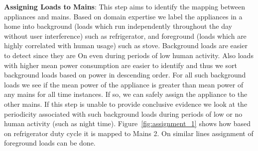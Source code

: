 \documentclass[conference]{IEEEtran}
\newcommand{\figref}[1]{Figure~\ref{#1}}
\begin{document}
\textbf{Assigning Loads to Mains}:
This step aims to identify the mapping between appliances and mains. Based on domain expertise we label the appliances in a home into background (loads which run independently throughout the day without user interference) such as refrigerator, and foreground (loads which are highly correlated with human usage) such as stove. Background loads are easier to detect since they are On even during periods of low human activity. Also loads with higher mean power consumption are easier to identify and thus we sort background loads based on power in descending order. For all such background loads we see if the mean power of the appliance is greater than mean power of any mains for all time instances. If so, we can safely assign the appliance to the other mains. If this step is unable to provide conclusive evidence we look at the periodicity associated with such background loads during periods of low or no human activity (such as night time). \figref{fig:assignment_1} shows how based on refrigerator duty cycle it is mapped to Mains 2. On similar lines assignment of foreground loads can be done.
\end{document}
